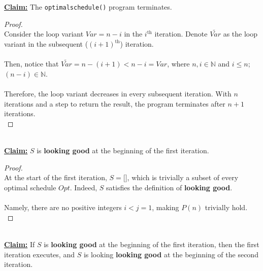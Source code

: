 \documentclass[12pt]{article}
\begin{document}
\underline{\textbf{Claim:}} The \texttt{optimalschedule()} program terminates.
\begin{proof}
\leavevmode\\
    Consider the loop variant \( Var = n - i \) in the \( i^{\text{th}} \) iteration. Denote \( \widetilde{Var} \) as the loop variant in the subsequent (\( (i + 1)^{\text{th}} \)) iteration. \\
    \\
    Then, notice that \( \widetilde{Var} = n - (i + 1) < n - i = Var \), where \( n, i \in \mathbb{N} \) and \( i \leq n \); \( (n - i) \in \mathbb{N} \). \\
    \\
    Therefore, the loop variant decreases in every subsequent iteration. With \( n \) iterations and a step to return the result, the program terminates after \( n + 1 \) iterations. \\ 
\end{proof}
\leavevmode\\
\underline{\textbf{Claim:}} \( S \) is \textbf{looking good} at the beginning of the first iteration.
\begin{proof}
\leavevmode\\
    At the start of the first iteration, \( S = \texttt{[]} \), which is trivially a subset of every optimal schedule \( Opt \). Indeed, \( S \) satisfies the definition of \textbf{looking good}. \\
    \\
    Namely, there are no positive integers \( i < j = 1 \), making \( P(n) \) trivially hold. \\
\end{proof}
\leavevmode\\
\underline{\textbf{Claim:}} If \( S \) is \textbf{looking good} at the beginning of the first iteration, then the first iteration executes, and \( S \) is looking \textbf{looking good} at the beginning of the second iteration.
\end{document}
